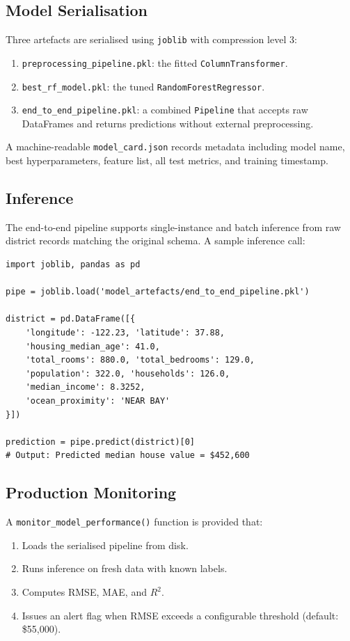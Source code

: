 \documentclass[conference]{IEEEtran}
\begin{document}
\subsection{Model Serialisation}

Three artefacts are serialised using \texttt{joblib} with compression level 3:
\begin{enumerate}
    \item \texttt{preprocessing\_pipeline.pkl}: the fitted \texttt{ColumnTransformer}.
    \item \texttt{best\_rf\_model.pkl}: the tuned \texttt{RandomForestRegressor}.
    \item \texttt{end\_to\_end\_pipeline.pkl}: a combined \texttt{Pipeline} that accepts raw DataFrames and returns predictions without external preprocessing.
\end{enumerate}

A machine-readable \texttt{model\_card.json} records metadata including model name, best hyperparameters, feature list, all test metrics, and training timestamp.

\subsection{Inference}

The end-to-end pipeline supports single-instance and batch inference from raw district records matching the original schema. A sample inference call:

\begin{lstlisting}[caption={Inference from serialised pipeline}, label={lst:inference}]
import joblib, pandas as pd

pipe = joblib.load('model_artefacts/end_to_end_pipeline.pkl')

district = pd.DataFrame([{
    'longitude': -122.23, 'latitude': 37.88,
    'housing_median_age': 41.0,
    'total_rooms': 880.0, 'total_bedrooms': 129.0,
    'population': 322.0, 'households': 126.0,
    'median_income': 8.3252,
    'ocean_proximity': 'NEAR BAY'
}])

prediction = pipe.predict(district)[0]
# Output: Predicted median house value = $452,600
\end{lstlisting}

\subsection{Production Monitoring}

A \texttt{monitor\_model\_performance()} function is provided that:
\begin{enumerate}
    \item Loads the serialised pipeline from disk.
    \item Runs inference on fresh data with known labels.
    \item Computes RMSE, MAE, and $R^2$.
    \item Issues an alert flag when RMSE exceeds a configurable threshold (default: \$55,000).
\end{enumerate}
\end{document}

